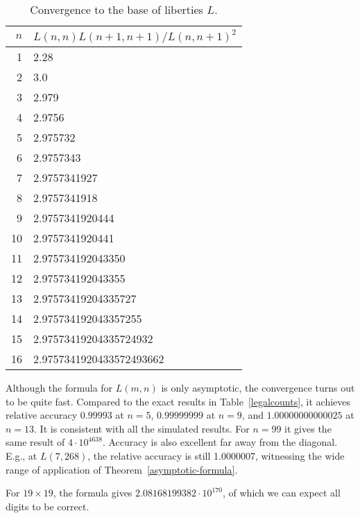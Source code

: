\documentclass{article}
\begin{document}
\begin{table}
\begin{center}
\begin{tabular}{|r|l|}
\hline
$n$ & $L(n,n)L(n+1,n+1)/L(n,n+1)^2$ \\ \hline
1   & 2.28 \\
2   & 3.0 \\
3   & 2.979 \\
4   & 2.9756 \\
5   & 2.975732 \\
6   & 2.9757343 \\
7   & 2.9757341927 \\
8   & 2.9757341918 \\
9   & 2.9757341920444 \\
10  & 2.9757341920441 \\
11  & 2.975734192043350 \\
12  & 2.975734192043355 \\
13  & 2.97573419204335727 \\
14  & 2.975734192043357255 \\
15  & 2.97573419204335724932 \\
16  & 2.9757341920433572493662 \\
\hline
\end{tabular}
\end{center}
\caption{Convergence to the base of liberties $L$.}
\label{Ldigits}
\end{table}


Although the formula for $L(m,n)$ is only asymptotic, the convergence
turns out to be quite fast. Compared to the exact results in
Table~\ref{legalcounts}, it achieves relative accuracy $0.99993$ at $n=5$,
$0.99999999$ at $n=9$, and $1.00000000000025$ at $n=13$. It is
consistent with all the simulated results. For $n=99$ it gives the
same result of $4 \cdot 10^{4638}$.
Accuracy is also excellent far away from the diagonal.
E.g., at $L(7,268)$, the relative accuracy is still 1.0000007,
witnessing the wide range of application of Theorem~\ref{asymptotic-formula}.

For $19 \times 19$, the formula gives $2.08168199382 \cdot 10^{170}$,
of which we can expect all digits to be correct.
\end{document}
